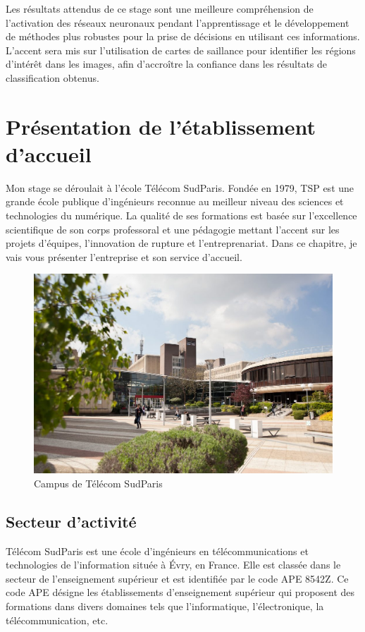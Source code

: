 \documentclass{report}
\begin{document}
{\hspace{1.6cm} Les résultats attendus de ce stage sont une meilleure compréhension de l'activation des réseaux neuronaux pendant l'apprentissage et le développement de méthodes plus robustes pour la prise de décisions en utilisant ces informations. L'accent sera mis sur l'utilisation de cartes de saillance pour identifier les régions d'intérêt dans les images, afin d'accroître la confiance dans les résultats de classification obtenus.

\chapter{Présentation de l’établissement d’accueil }
\hspace{1.6cm}Mon stage se déroulait à l'école Télécom SudParis. Fondée en 1979, TSP est une grande école publique d'ingénieurs reconnue au meilleur niveau des sciences et technologies du numérique. La qualité de ses formations est basée sur l’excellence scientifique de son corps professoral et une pédagogie mettant l’accent sur les projets d’équipes, l’innovation de rupture et l’entreprenariat. Dans ce chapitre, je vais vous présenter l'entreprise et son service d'accueil.
\begin{figure}[htbp] 
	\centering
        \includegraphics[width=11.5cm]{logo/telecomsudparis.jpg} 
	\caption{Campus de Télécom SudParis}
	\label{fig:Télécom SudParis}
\end{figure}
\section{Secteur d'activité }
\hspace{1.6cm} Télécom SudParis est une école d'ingénieurs en télécommunications et technologies de l'information située à Évry, en France. Elle est classée dans le secteur de l'enseignement supérieur et est identifiée par le code APE 8542Z. Ce code APE désigne les établissements d'enseignement supérieur qui proposent des formations dans divers domaines tels que l'informatique, l'électronique, la télécommunication, etc.
\vspace*{0.5\baselineskip}
\newpage

}
\end{document}
